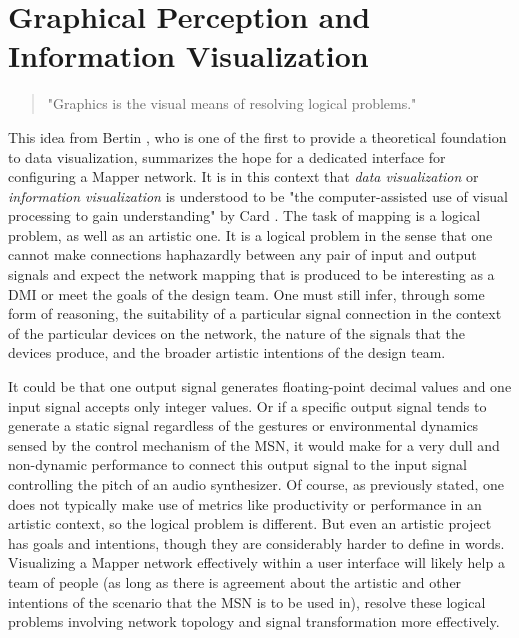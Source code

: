 \section{Graphical Perception and Information Visualization}
\label{sec:Graphical Perception}

\begin{quote}
"Graphics is the visual means of resolving logical problems."
\end{quote}

This idea from Bertin \cite{semiology1983}, who is one of the first to provide a theoretical foundation to data visualization, summarizes the hope for a dedicated interface for configuring a Mapper network. It is in this context that \emph{data visualization} or \emph{information visualization} is understood to be "the computer-assisted use of visual processing to gain understanding" by Card \cite{card1997}. 
The task of mapping is a logical problem, as well as an artistic one. It is a logical problem in the sense that one cannot make connections haphazardly between any pair of input and output signals and expect the network mapping that is produced to be interesting as a DMI or meet the goals of the design team. One must still infer, through some form of reasoning, the suitability of a particular signal connection in the context of the particular devices on the network, the nature of the signals that the devices produce, and the broader artistic intentions of the design team. 

It could be that one output signal generates floating-point decimal values and one input signal accepts only integer values. Or if a specific output signal tends to generate a static signal regardless of the gestures or environmental dynamics sensed by the control mechanism of the MSN, it would make for a very dull and non-dynamic performance to connect this output signal to the input signal controlling the pitch of an audio synthesizer. Of course, as previously stated, one does not typically make use of metrics like productivity or performance in an artistic context, so the logical problem is different. But even an artistic project has goals and intentions, though they are considerably harder to define in words. Visualizing a Mapper network effectively within a user interface will likely help a team of people (as long as there is agreement about the artistic and other intentions of the scenario that the MSN is to be used in), resolve these logical problems involving network topology and signal transformation more effectively. 

